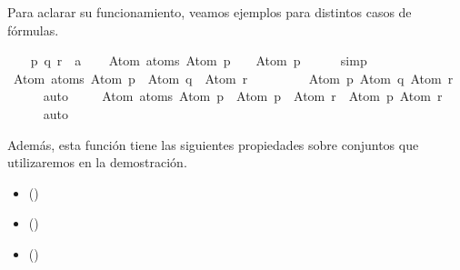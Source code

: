\begin{isabellebody}
\begin{isamarkuptext}
  Para aclarar su funcionamiento, veamos ejemplos para distintos casos 
  de fórmulas.%
\end{isamarkuptext}\isamarkuptrue%
\isamarkupfalse%
\isanewline
{}\isanewline
%
\isadelimproof
\ \ %
\endisadelimproof
%
\isatagproof
{}\isamarkupfalse%
\ p\ q\ r\ {\isacharcolon}{\isacharcolon}\ {\isacharprime}a\isanewline
\isanewline
\ \ \isamarkupfalse%
\ {\isachardoublequoteopen}Atom\ {\isacharbackquote}atoms\ {\isacharparenleft}Atom\ p\ \isactrlbold {\isasymor}\ {\isasymbottom}{\isacharparenright}\ {\isacharequal}\ {\isacharbraceleft}Atom\ p{\isacharbraceright}{\isachardoublequoteclose}\isanewline
\ \ \ \ \isamarkupfalse%
\ simp\isanewline
\isanewline
\ \ \isamarkupfalse%
\ {\isachardoublequoteopen}Atom\ {\isacharbackquote}atoms\ {\isacharparenleft}{\isacharparenleft}Atom\ p\ \isactrlbold {\isasymrightarrow}\ Atom\ q{\isacharparenright}\ \isactrlbold {\isasymor}\ Atom\ r{\isacharparenright}\ {\isacharequal}\ \isanewline
\ \ \ \ \ \ \ {\isacharbraceleft}Atom\ p{\isacharcomma}\ Atom\ q{\isacharcomma}\ Atom\ r{\isacharbraceright}{\isachardoublequoteclose}\isanewline
\ \ \ \ \isamarkupfalse%
\ auto\ \isanewline
\isanewline
\ \ \isamarkupfalse%
\ {\isachardoublequoteopen}Atom\ {\isacharbackquote}atoms\ {\isacharparenleft}{\isacharparenleft}Atom\ p\ \isactrlbold {\isasymrightarrow}\ Atom\ p{\isacharparenright}\ \isactrlbold {\isasymor}\ Atom\ r{\isacharparenright}\ {\isacharequal}\ {\isacharbraceleft}Atom\ p{\isacharcomma}\ Atom\ r{\isacharbraceright}{\isachardoublequoteclose}\isanewline
\ \ \ \ \isamarkupfalse%
\ auto%
\endisatagproof
{\isafoldproof}%
%
\isadelimproof
\isanewline
%
\endisadelimproof
{}\isamarkupfalse%
%
\begin{isamarkuptext}%
Además, esta función tiene las siguientes propiedades sobre 
  conjuntos que utilizaremos en la demostración.

  \begin{itemize}
    \item[]  
      \hfill ()
    \item[]  
      \hfill ()
    \item[]  
      \hfill ()
  \end{itemize}


\end{isamarkuptext}
\end{isabellebody}
